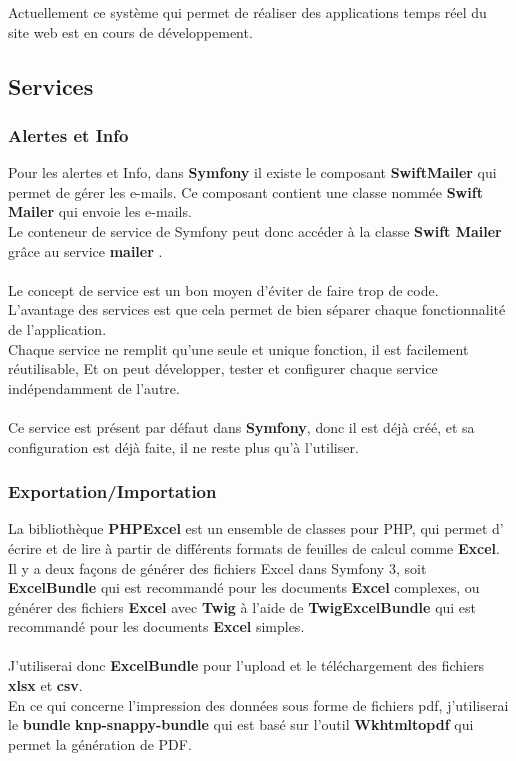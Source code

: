 \documentclass[12pt]{article}
\begin{document}
Actuellement ce système qui permet de réaliser des applications temps réel du site web est en cours de développement.\\

\subsection{Services }

\subsubsection{Alertes et Info}

Pour les alertes et Info, dans \textbf{Symfony} il existe le composant \textbf{SwiftMailer} qui permet de gérer les e-mails. Ce composant contient une classe nommée \textbf{Swift Mailer} qui envoie  les e-mails. \\
 Le conteneur de service de Symfony peut donc accéder à la classe \textbf{Swift Mailer}  grâce au service \textbf{mailer} .\\
 \\
 
 Le concept de service est un bon moyen d'éviter de faire trop de code.\\
 L'avantage des services est que cela permet de bien séparer chaque fonctionnalité de l'application. \\
 Chaque service ne remplit qu'une seule et unique fonction, il est facilement réutilisable, Et on peut  développer, tester et configurer chaque service indépendamment de l'autre. \\ \\
 
Ce service est présent par défaut dans \textbf{Symfony}, donc il est déjà créé, et sa configuration est déjà faite, il ne reste plus qu'à l'utiliser.

\subsubsection{Exportation/Importation}

La bibliothèque \textbf{PHPExcel} est un ensemble de classes pour  PHP, qui  permet d' écrire et de lire à partir de différents formats de feuilles de calcul comme \textbf{Excel}.\\
Il y a deux façons de générer des fichiers Excel dans Symfony 3, soit  \textbf{ExcelBundle} qui est recommandé pour les documents \textbf{Excel}  complexes,   ou  générer des fichiers \textbf{Excel} avec \textbf{Twig} à l'aide de \textbf{TwigExcelBundle}   qui est recommandé pour les documents \textbf{Excel} simples.\\
\\
J'utiliserai donc \textbf{ExcelBundle} pour l'upload et le téléchargement des fichiers \textbf{xlsx} et \textbf{csv}.\\
En ce qui concerne l'impression des données sous forme de fichiers pdf, j'utiliserai le \textbf{bundle}  \textbf{knp-snappy-bundle} qui est basé sur l'outil \textbf{Wkhtmltopdf} qui permet  la génération de PDF.\\
\end{document}
